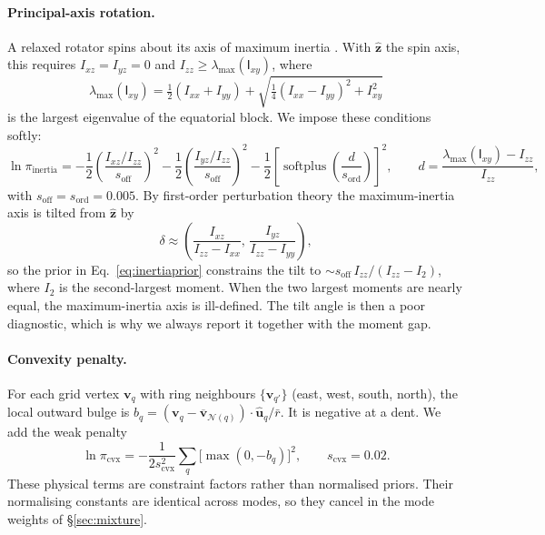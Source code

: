 \documentclass[11pt,a4paper]{article}
\theoremstyle{remark}
\newcommand{\vect}[1]{\bm{#1}}
\newcommand{\uv}[1]{\hat{\bm{#1}}}
\DeclareMathOperator{\softplus}{softplus}
\begin{document}
\paragraph{Principal-axis rotation.} A relaxed rotator spins about its axis of maximum inertia
\citep{burns1973}. With $\uv z$ the spin axis, this requires $I_{xz}=I_{yz}=0$ and
$I_{zz}\ge\lambda_{\max}(\mathsf I_{xy})$, where
\begin{equation}
  \lambda_{\max}(\mathsf I_{xy})=\tfrac12(I_{xx}+I_{yy})+\sqrt{\tfrac14(I_{xx}-I_{yy})^2+I_{xy}^2}
\end{equation}
is the largest eigenvalue of the equatorial block. We impose these conditions softly:
\begin{equation}
  \ln\pi_{\mathrm{inertia}}=-\frac12\left(\frac{I_{xz}/I_{zz}}{s_{\mathrm{off}}}\right)^{\!2}
  -\frac12\left(\frac{I_{yz}/I_{zz}}{s_{\mathrm{off}}}\right)^{\!2}
  -\frac12\left[\softplus\!\left(\frac{d}{s_{\mathrm{ord}}}\right)\right]^2,\qquad
  d=\frac{\lambda_{\max}(\mathsf I_{xy})-I_{zz}}{I_{zz}},
  \label{eq:inertiaprior}
\end{equation}
with $s_{\mathrm{off}}=s_{\mathrm{ord}}=0.005$. By first-order perturbation theory the
maximum-inertia axis is tilted from $\uv z$ by
\begin{equation}
  \delta\approx\left(\frac{I_{xz}}{I_{zz}-I_{xx}},\,\frac{I_{yz}}{I_{zz}-I_{yy}}\right),
\end{equation}
so the prior in Eq.~\eqref{eq:inertiaprior} constrains the tilt to
$\sim s_{\mathrm{off}}\,I_{zz}/(I_{zz}-I_2)$, where $I_2$ is the second-largest moment. When the two
largest moments are nearly equal, the maximum-inertia axis is ill-defined. The tilt angle is then a
poor diagnostic, which is why we always report it together with the moment gap.

\paragraph{Convexity penalty.} For each grid vertex $\vect v_q$ with ring neighbours
$\{\vect v_{q'}\}$ (east, west, south, north), the local outward bulge is
$b_q=(\vect v_q-\overline{\vect v}_{\mathcal N(q)})\cdot\uv u_q/\bar r$. It is negative at a dent. We
add the weak penalty
\begin{equation}
  \ln\pi_{\mathrm{cvx}}=-\frac{1}{2s_{\mathrm{cvx}}^2}\sum_q\bigl[\max(0,-b_q)\bigr]^2,\qquad s_{\mathrm{cvx}}=0.02 .
\end{equation}
These physical terms are constraint factors rather than normalised priors. Their normalising constants
are identical across modes, so they cancel in the mode weights of \S\ref{sec:mixture}.
\end{document}
